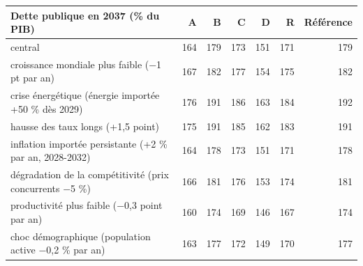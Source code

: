 \begin{tabular}{p{4.6cm}rrrrrr}
\toprule
Dette publique en 2037 (\% du PIB) & A & B & C & D & R & Référence \\
\midrule
central & 164 & 179 & 173 & 151 & 171 & 179 \\
croissance mondiale plus faible (−1 pt par an) & 167 & 182 & 177 & 154 & 175 & 182 \\
crise énergétique (énergie importée +50 \% dès 2029) & 176 & 191 & 186 & 163 & 184 & 192 \\
hausse des taux longs (+1,5 point) & 175 & 191 & 185 & 162 & 183 & 191 \\
inflation importée persistante (+2 \% par an, 2028-2032) & 164 & 178 & 173 & 151 & 171 & 178 \\
dégradation de la compétitivité (prix concurrents −5 \%) & 166 & 181 & 176 & 153 & 174 & 181 \\
productivité plus faible (−0,3 point par an) & 160 & 174 & 169 & 146 & 167 & 174 \\
choc démographique (population active −0,2 \% par an) & 163 & 177 & 172 & 149 & 170 & 177 \\
\bottomrule
\end{tabular}
